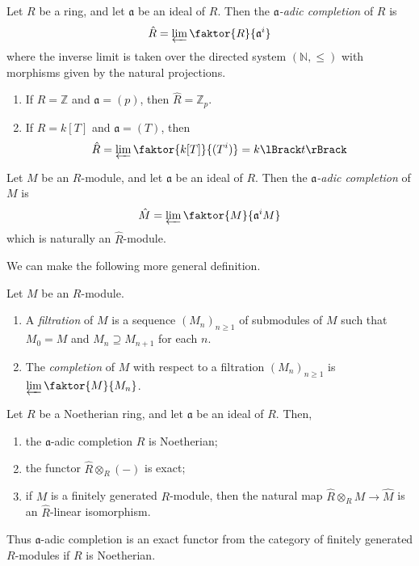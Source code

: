 \begin{definition}
    Let \( R \) be a ring, and let \( \mathfrak a \) be an ideal of \( R \).
    Then the \emph{\( \mathfrak a \)-adic completion} of \( R \) is
    \[ \hat R = \varprojlim \faktor{R}{\mathfrak a^i} \]
    where the inverse limit is taken over the directed system \( (\mathbb N, \leq) \) with morphisms given by the natural projections.
\end{definition}
\begin{example}
    \begin{enumerate}
        \item If \( R = \mathbb Z \) and \( \mathfrak a = (p) \), then \( \hat R = \mathbb Z_p \).
        \item If \( R = k[T] \) and \( \mathfrak a = (T) \), then
        \[ \hat R = \varprojlim \faktor{k[T]}{(T^i)} = k\Brackets{t} \]
    \end{enumerate}
\end{example}
\begin{definition}
    Let \( M \) be an \( R \)-module, and let \( \mathfrak a \) be an ideal of \( R \).
    Then the \emph{\( \mathfrak a \)-adic completion} of \( M \) is
    \[ \hat M = \varprojlim \faktor{M}{\mathfrak a^i M} \]
    which is naturally an \( \hat R \)-module.
\end{definition}
We can make the following more general definition.
\begin{definition}
    Let \( M \) be an \( R \)-module.
    \begin{enumerate}
        \item A \emph{filtration} of \( M \) is a sequence \( (M_n)_{n \geq 1} \) of submodules of \( M \) such that \( M_0 = M \) and \( M_n \supseteq M_{n+1} \) for each \( n \).
        \item The \emph{completion} of \( M \) with respect to a filtration \( (M_n)_{n \geq 1} \) is \( \varprojlim \faktor{M}{M_n} \).
    \end{enumerate}
\end{definition}
\begin{theorem}
    Let \( R \) be a Noetherian ring, and let \( \mathfrak a \) be an ideal of \( R \).
    Then,
    \begin{enumerate}
        \item the \( \mathfrak a \)-adic completion \( \hat R \) is Noetherian;
        \item the functor \( \hat R \otimes_R (-) \) is exact;
        \item if \( M \) is a finitely generated \( R \)-module, then the natural map \( \hat R \otimes_R M \to \hat M \) is an \( \hat R \)-linear isomorphism. 
    \end{enumerate}
\end{theorem}
Thus \( \mathfrak a \)-adic completion is an exact functor from the category of finitely generated \( R \)-modules if \( R \) is Noetherian.

